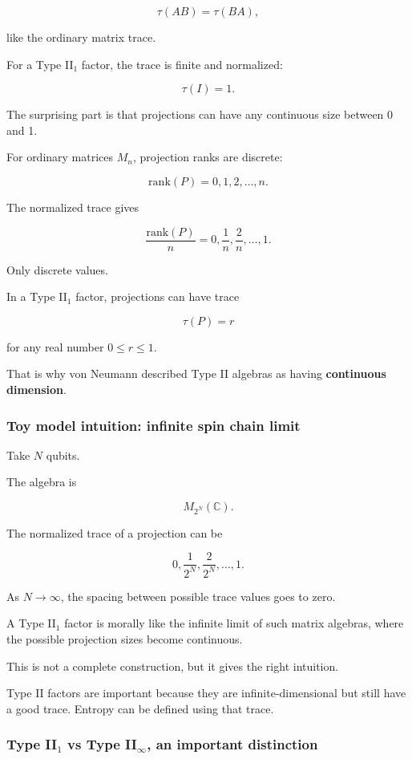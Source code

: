\documentclass[11pt,a4paper]{article}
\begin{document}
\[
\tau(AB)=\tau(BA),
\]

like the ordinary matrix trace.

For a Type II$_1$ factor, the trace is finite and normalized:

\[
\tau(I)=1.
\]

The surprising part is that projections can have any continuous size between 0 and 1.

For ordinary matrices $M_n$, projection ranks are discrete:

\[
\mathrm{rank}(P)=0,1,2,\dots,n.
\]

The normalized trace gives

\[
\frac{\mathrm{rank}(P)}{n}
=
0,\frac{1}{n},\frac{2}{n},\dots,1.
\]

Only discrete values.

In a Type II$_1$ factor, projections can have trace

\[
\tau(P)=r
\]

for any real number $0\leq r\leq 1$.

That is why von Neumann described Type II algebras as having \textbf{continuous dimension}.

\subsubsection{Toy model intuition: infinite spin chain limit}

Take $N$ qubits.

The algebra is

\[
M_{2^N}(\mathbb{C}).
\]

The normalized trace of a projection can be

\[
0,\frac{1}{2^N},\frac{2}{2^N},\dots,1.
\]

As $N\to\infty$, the spacing between possible trace values goes to zero.

A Type II$_1$ factor is morally like the infinite limit of such matrix algebras, where the possible projection sizes become continuous.

This is not a complete construction, but it gives the right intuition.

Type II factors are important because they are infinite-dimensional but still have a good trace. Entropy can be defined using that trace.

\subsubsection{Type II$_1$ vs Type II$_\infty$, an important distinction}
\end{document}
